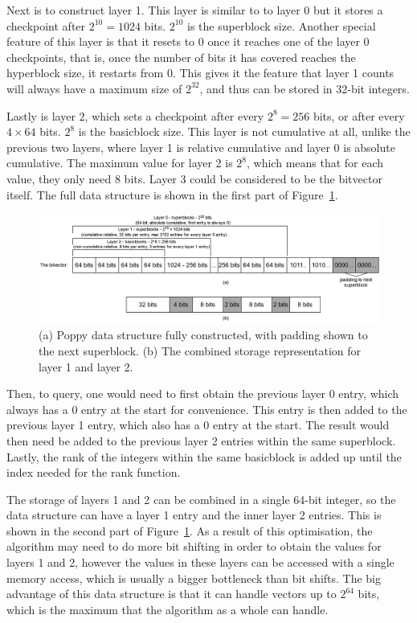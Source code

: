 Next is to construct layer 1.
This layer is similar to to layer 0 but it stores a checkpoint after $2^{10} = 1024$ bits.
$2^{10}$ is the superblock size.
Another special feature of this layer is that it resets to 0 once it reaches one of the layer 0 checkpoints, that is, once the number of bits it has covered reaches the hyperblock size, it restarts from 0.
This gives it the feature that layer 1 counts will always have a maximum size of $2^{32}$, and thus can be stored in 32-bit integers.

Lastly is layer 2, which sets a checkpoint after every $2^8 = 256$ bits, or after every $4 \times 64$ bits.
$2^8$ is the basicblock size.
This layer is not cumulative at all, unlike the previous two layers, where layer 1 is relative cumulative and layer 0 is absolute cumulative.
The maximum value for layer 2 is $2^8$, which means that for each value, they only need 8 bits.
Layer 3 could be considered to be the bitvector itself.
The full data structure is shown in the first part of Figure~\ref{fig:Poppy}.

\begin{figure}[t]
  \centering
  \includegraphics[width=\textwidth]{images/Poppy.png}
  \caption{(a) Poppy data structure fully constructed, with padding shown to the next superblock. (b) The combined storage representation for layer 1 and layer 2.}\label{fig:Poppy}
\end{figure}

Then, to query, one would need to first obtain the previous layer 0 entry, which always has a 0 entry at the start for convenience.
This entry is then added to the previous layer 1 entry, which also has a 0 entry at the start.
The result would then need be added to the previous layer 2 entries within the same superblock.
Lastly, the rank of the integers within the same basicblock is added up until the index needed for the rank function.

The storage of layers 1 and 2 can be combined in a single 64-bit integer, so the data structure can have a layer 1 entry and the inner layer 2 entries.
This is shown in the second part of Figure~\ref{fig:Poppy}.
As a result of this optimisation, the algorithm may need to do more bit shifting in order to obtain the values for layers 1 and 2, however the values in these layers can be accessed with a single memory access, which is usually a bigger bottleneck than bit shifts.
The big advantage of this data structure is that it can handle vectors up to $2^{64}$ bits, which is the maximum that the algorithm as a whole can handle.

